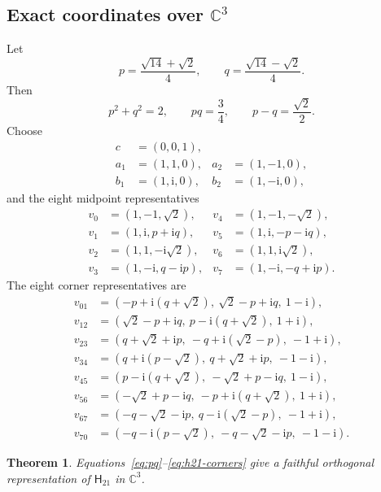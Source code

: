 \documentclass[twocolumn,aps,pra,floatfix,amsmath,amssymb,longbibliography]{revtex4-2}
\newtheorem{theorem}{Theorem}
\theoremstyle{definition}
\theoremstyle{remark}
\newcommand{\ii}{\mathrm{i}}
\newcommand{\C}{\mathbb C}
\newcommand{\Htwentyone}{\mathsf H_{21}}
\begin{document}
\subsection{Exact coordinates over \texorpdfstring{$\C^3$}{C3}}

Let
\begin{equation}
 p=\frac{\sqrt{14}+\sqrt2}{4},\qquad
 q=\frac{\sqrt{14}-\sqrt2}{4}.
 \label{eq:pq}
\end{equation}
Then
\begin{equation}
 p^2+q^2=2,\qquad pq=\frac34,\qquad p-q=\frac{\sqrt2}{2}.
 \label{eq:pq-identities}
\end{equation}
Choose
\begin{align}
 c&=(0,0,1),\nonumber\\
 a_1&=(1,1,0),&a_2&=(1,-1,0),\nonumber\\
 b_1&=(1,\ii,0),&b_2&=(1,-\ii,0),
 \label{eq:h21-inner}
\end{align}
and the eight midpoint representatives
\begin{align}
 v_0&=(1,-1,\sqrt2),&v_4&=(1,-1,-\sqrt2),\nonumber\\
 v_1&=(1,\ii,p+\ii q),&v_5&=(1,\ii,-p-\ii q),\nonumber\\
 v_2&=(1,1,-\ii\sqrt2),&v_6&=(1,1,\ii\sqrt2),\nonumber\\
 v_3&=(1,-\ii,q-\ii p),&v_7&=(1,-\ii,-q+\ii p).
 \label{eq:h21-midpoints}
\end{align}
The eight corner representatives are
\begin{align}
 v_{01}&=(-p+\ii(q+\sqrt2),\ \sqrt2-p+\ii q,\ 1-\ii),\nonumber\\
 v_{12}&=(\sqrt2-p+\ii q,\ p-\ii(q+\sqrt2),\ 1+\ii),\nonumber\\
 v_{23}&=(q+\sqrt2+\ii p,\ -q+\ii(\sqrt2-p),\ -1+\ii),\nonumber\\
 v_{34}&=(q+\ii(p-\sqrt2),\ q+\sqrt2+\ii p,\ -1-\ii),\nonumber\\
 v_{45}&=(p-\ii(q+\sqrt2),\ -\sqrt2+p-\ii q,\ 1-\ii),\nonumber\\
 v_{56}&=(-\sqrt2+p-\ii q,\ -p+\ii(q+\sqrt2),\ 1+\ii),\nonumber\\
 v_{67}&=(-q-\sqrt2-\ii p,\ q-\ii(\sqrt2-p),\ -1+\ii),\nonumber\\
 v_{70}&=(-q-\ii(p-\sqrt2),\ -q-\sqrt2-\ii p,\ -1-\ii).
 \label{eq:h21-corners}
\end{align}

\begin{theorem}
\label{thm:h21-complex}
Equations~\eqref{eq:pq}--\eqref{eq:h21-corners} give a faithful
orthogonal representation of $\Htwentyone$ in $\C^3$.
\end{theorem}
\end{document}
